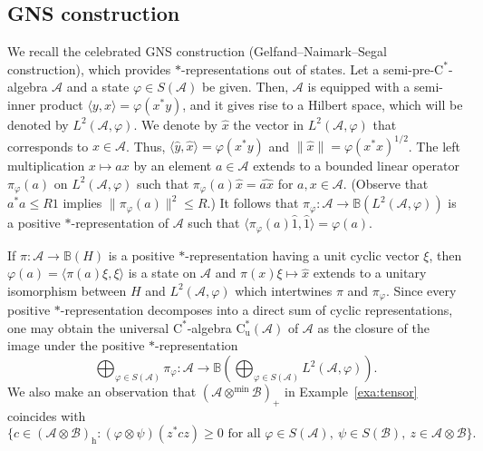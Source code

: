 \documentclass[12pt]{amsart}
\theoremstyle{definition}
\begin{document}
\subsection{GNS construction}
We recall the celebrated GNS
construction (Gel\-fand--Nai\-mark--Segal construction),
which provides {$*$-repre\-sen\-ta\-tion\xspace}{}s out of states.
Let a {semi-pre-$\mathrm{C}^*$-alge\-bra\xspace} ${{\mathcal A}}$ and a state ${\varphi}\in S({{\mathcal A}})$ be given.
Then, ${{\mathcal A}}$ is equipped with a semi-inner product
${\mathopen{\langle}{y,x}\mathclose{\rangle}}={\varphi}(x^*y)$, and it gives rise to a Hilbert space,
which will be denoted by $L^2({{\mathcal A}},{\varphi})$.
We denote by $\hat{x}$ the vector in $L^2({{\mathcal A}},{\varphi})$ that corresponds to $x\in{{\mathcal A}}$.
Thus, ${\mathopen{\langle}{\hat{y},\hat{x}}\mathclose{\rangle}}={\varphi}(x^*y)$ and $\|\hat{x}\|={\varphi}(x^*x)^{1/2}$.
The left multiplication $x\mapsto ax$ by an element $a\in{{\mathcal A}}$ extends
to a bounded linear operator $\pi_{\varphi}(a)$ on $L^2({{\mathcal A}},{\varphi})$ such that
$\pi_{\varphi}(a)\hat{x}=\widehat{ax}$ for $a,x\in{{\mathcal A}}$.
(Observe that $a^*a\le R1$ implies $\|\pi_{\varphi}(a)\|^2\le R$.)
It follows that $\pi_{\varphi}\colon{{\mathcal A}}\to{{\mathbb B}}(L^2({{\mathcal A}},{\varphi}))$ is a positive {$*$-repre\-sen\-ta\-tion\xspace} of ${{\mathcal A}}$ such that
${\mathopen{\langle}{\pi_{\varphi}(a)\hat{1},\hat{1}}\mathclose{\rangle}}={\varphi}(a)$.

If $\pi\colon {{\mathcal A}}\to{{\mathbb B}}({H})$ is a positive {$*$-repre\-sen\-ta\-tion\xspace}
having a unit cyclic vector $\xi$, then ${\varphi}(a)={\mathopen{\langle}{\pi(a)\xi,\xi}\mathclose{\rangle}}$
is a state on ${{\mathcal A}}$ and $\pi(x)\xi\mapsto\hat{x}$ extends to a
unitary isomorphism between ${H}$ and $L^2({{\mathcal A}},{\varphi})$ which intertwines
$\pi$ and $\pi_{\varphi}$. Since every positive {$*$-repre\-sen\-ta\-tion\xspace} decomposes
into a direct sum of cyclic representations, one may obtain the universal
{$\mathrm{C}^*$-alge\-bra\xspace} $\mathrm{C}^*_{\mathrm{u}}({{\mathcal A}})$ of ${{\mathcal A}}$ as the closure of the image
under the positive {$*$-repre\-sen\-ta\-tion\xspace}
\[
\bigoplus_{{\varphi}\in S({{\mathcal A}})}\pi_{\varphi} \colon {{\mathcal A}}\to{{\mathbb B}}(\bigoplus_{{\varphi}\in S({{\mathcal A}})}L^2({{\mathcal A}},{\varphi})).
\]
We also make an observation that $({{\mathcal A}}\otimes^{\min}{{\mathcal B}})_+$ in Example~\ref{exa:tensor}
coincides with
\[
\{ c\in ({{\mathcal A}}\otimes{{\mathcal B}})_{\mathrm{h}} : ({\varphi}\otimes\psi)(z^*cz)\geq0
\mbox{ for all }{\varphi}\in S({{\mathcal A}}),\ \psi\in S({{\mathcal B}}),\ z\in{{\mathcal A}}\otimes{{\mathcal B}}\}.
\]
\end{document}
